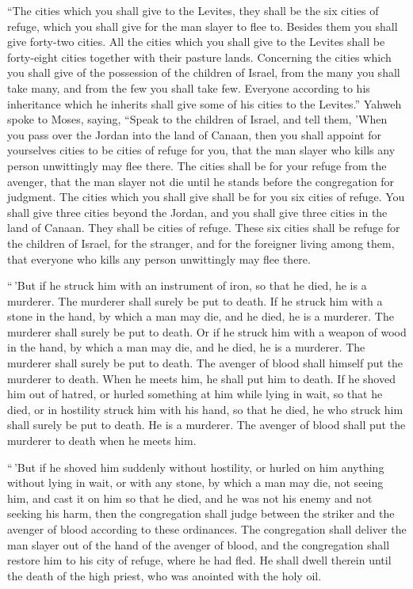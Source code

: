  ``The cities which you shall give to the Levites, they
shall be the six cities of refuge, which you shall give for the man
slayer to flee to. Besides them you shall give forty-two cities.
 All the cities which you shall give to the Levites shall
be forty-eight cities together with their pasture lands. 
Concerning the cities which you shall give of the possession of the
children of Israel, from the many you shall take many, and from the few
you shall take few. Everyone according to his inheritance which he
inherits shall give some of his cities to the Levites.'' 
Yahweh spoke to Moses, saying,  ``Speak to the children
of Israel, and tell them, 'When you pass over the Jordan into the land
of Canaan,  then you shall appoint for yourselves cities
to be cities of refuge for you, that the man slayer who kills any person
unwittingly may flee there.  The cities shall be for your
refuge from the avenger, that the man slayer not die until he stands
before the congregation for judgment.  The cities which
you shall give shall be for you six cities of refuge. 
You shall give three cities beyond the Jordan, and you shall give three
cities in the land of Canaan. They shall be cities of refuge.
 These six cities shall be refuge for the children of
Israel, for the stranger, and for the foreigner living among them, that
everyone who kills any person unwittingly may flee there.

 ``\,'But if he struck him with an instrument of iron, so
that he died, he is a murderer. The murderer shall surely be put to
death.  If he struck him with a stone in the hand, by
which a man may die, and he died, he is a murderer. The murderer shall
surely be put to death.  Or if he struck him with a
weapon of wood in the hand, by which a man may die, and he died, he is a
murderer. The murderer shall surely be put to death.  The
avenger of blood shall himself put the murderer to death. When he meets
him, he shall put him to death.  If he shoved him out of
hatred, or hurled something at him while lying in wait, so that he died,
 or in hostility struck him with his hand, so that he
died, he who struck him shall surely be put to death. He is a murderer.
The avenger of blood shall put the murderer to death when he meets him.

 ``\,'But if he shoved him suddenly without hostility, or
hurled on him anything without lying in wait,  or with
any stone, by which a man may die, not seeing him, and cast it on him so
that he died, and he was not his enemy and not seeking his harm,
 then the congregation shall judge between the striker
and the avenger of blood according to these ordinances. 
The congregation shall deliver the man slayer out of the hand of the
avenger of blood, and the congregation shall restore him to his city of
refuge, where he had fled. He shall dwell therein until the death of the
high priest, who was anointed with the holy oil.

